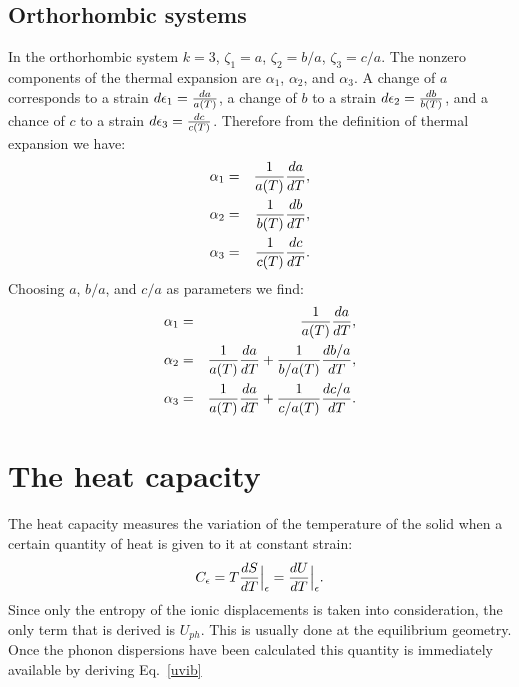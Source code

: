 \documentclass[12pt,a4paper]{article}
\begin{document}
\subsection{\color{web-blue}Orthorhombic systems}
In the orthorhombic system $k=3$, $\zeta_1=a$, $\zeta_2=b/a$, 
$\zeta_3=c/a$. The nonzero components of the thermal expansion are 
$\alpha_{1}$, $\alpha_{2}$, and $\alpha_{3}$. 
A change of $a$ corresponds to a strain ${d\epsilon_1}={da\over a(T)}$,  
a change of $b$ to a strain ${d\epsilon_2}={db\over b(T)}$,  
and a chance of $c$ to a strain ${d\epsilon_3}={dc\over c(T)}$. 
Therefore from the definition of thermal expansion we have:  
\begin{eqnarray}
\alpha_{1} &=&  {1\over a(T) } {d a \over dT}, \\ 
\alpha_{2} &=&  {1\over b(T) } {d b \over dT}, \\
\alpha_{3} &=&  {1\over c(T) } {d c \over dT}.
\end{eqnarray}
Choosing $a$, $b/a$, and $c/a$ as parameters we find:
\begin{eqnarray}
\alpha_1 &=& {1\over a(T)} {d a \over dT}, \\
\alpha_2 &=& {1\over a(T)} {da \over d T}  + {1\over b/a(T)} {d b/a \over dT}, \\
\alpha_3 &=& {1\over a(T)} {da \over d T}  + {1\over c/a(T)} {d c/a \over dT}.
\end{eqnarray}



\newpage
\section{\color{coral}The heat capacity}
The heat capacity measures the variation of the temperature of the solid
when a certain quantity of heat is given to it at constant strain:
\begin{equation}
C_\epsilon= T {d S \over dT}\Big|_\epsilon = { d U \over d T}\Big|_\epsilon.
\end{equation}
Since only the entropy of the ionic displacements is taken into consideration,
the only term that is derived is $U_{ph}$. This is usually done at the
equilibrium geometry. Once the phonon dispersions have been calculated this
quantity is immediately available by deriving Eq.~\ref{uvib}
\end{document}
